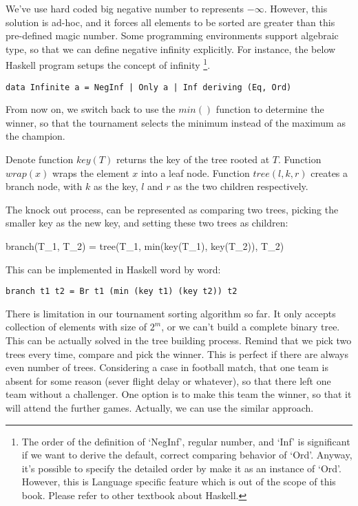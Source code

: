\documentclass{article}
\begin{document}
We've use hard coded big negative number to represents $-\infty$. However, this solution is ad-hoc, and
it forces all elements to be sorted are greater than this pre-defined magic number. Some programming
environments support algebraic type, so that we can define negative infinity explicitly. For instance,
the below Haskell program setups the concept of infinity \footnote{The order of the definition of `NegInf',
regular number, and `Inf' is significant if we want to derive the default, correct comparing behavior of `Ord'.
Anyway, it's possible to specify the detailed order by make it as an instance of `Ord'. However, this is
Language specific feature which is out of the scope of this book. Please refer to other textbook about Haskell.}.

\lstset{language=Haskell}
\begin{lstlisting}
data Infinite a = NegInf | Only a | Inf deriving (Eq, Ord)
\end{lstlisting}

From now on, we switch back to use the $min()$ function to determine the winner, so that the tournament selects the minimum
instead of the maximum as the champion.

Denote function $key(T)$ returns the key of the tree rooted at $T$. Function $wrap(x)$ wraps the element
$x$ into a leaf node. Function $tree(l, k, r)$ creates a branch node, with $k$ as the key, $l$ and $r$
as the two children respectively.

The knock out process, can be represented as comparing two trees, picking the smaller key as the new
key, and setting these two trees as children:

\be
branch(T_1, T_2) = tree(T_1, min(key(T_1), key(T_2)), T_2)
\ee

This can be implemented in Haskell word by word:

\lstset{language=Haskell}
\begin{lstlisting}
branch t1 t2 = Br t1 (min (key t1) (key t2)) t2
\end{lstlisting}

There is limitation in our tournament sorting algorithm so far. It only accepts collection of elements
with size of $2^m$, or we can't build a complete binary tree. This can be actually solved in the tree
building process. Remind that we pick two trees every time, compare and pick the winner. This is perfect
if there are always even number of trees. Considering a case in football match, that one team is absent
for some reason (sever flight delay or whatever), so that there left one team without a challenger.
One option is to make this team the winner, so that it will attend the further games. Actually, we can
use the similar approach.
\end{document}
